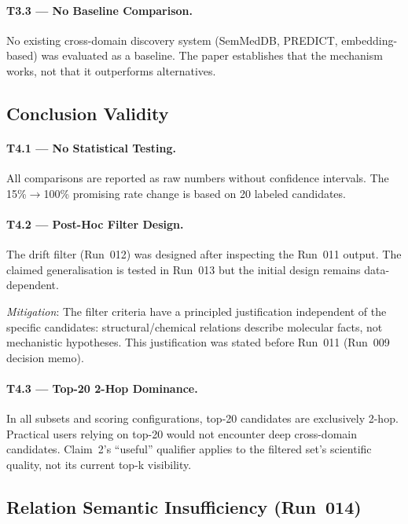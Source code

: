 \paragraph{T3.3 --- No Baseline Comparison.}
No existing cross-domain discovery system (SemMedDB, PREDICT, embedding-based)
was evaluated as a baseline.
The paper establishes that the mechanism works, not that it outperforms alternatives.

\subsection{Conclusion Validity}

\paragraph{T4.1 --- No Statistical Testing.}
All comparisons are reported as raw numbers without confidence intervals.
The 15\%$\to$100\% promising rate change is based on 20 labeled candidates.

\paragraph{T4.2 --- Post-Hoc Filter Design.}
The drift filter (Run~012) was designed after inspecting the Run~011 output.
The claimed generalisation is tested in Run~013 but the initial design remains
data-dependent.

\textit{Mitigation}: The filter criteria have a principled justification
independent of the specific candidates: structural/chemical relations describe
molecular facts, not mechanistic hypotheses. This justification was stated
before Run~011 (Run~009 decision memo).

\paragraph{T4.3 --- Top-20 2-Hop Dominance.}
In all subsets and scoring configurations, top-20 candidates are exclusively 2-hop.
Practical users relying on top-20 would not encounter deep cross-domain candidates.
Claim~2's ``useful'' qualifier applies to the filtered set's scientific quality,
not its current top-k visibility.

\subsection{Relation Semantic Insufficiency (Run~014)}

